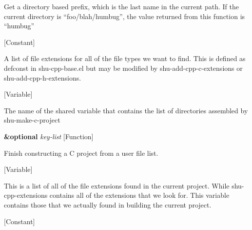 \begin{doc-string}
Get a directory based prefix, which is the last name in the current path.  If the current
directory is ``foo/blah/humbug'', the value returned from this function is ``humbug''
\end{doc-string}

\vspace{1em}
\noindent
{}
\usebox{\funcname}
 \hfill [Constant]

\begin{doc-string}
A list of file extensions for all of the file types we want to find.  This is defined
as defconst in shu-cpp-base.el but may be modified by shu-add-cpp-c-extensions or
shu-add-cpp-h-extensions.
\end{doc-string}

\vspace{1em}
\noindent
{}
\usebox{\funcname}
 \hfill [Variable]

\begin{doc-string}
The name of the shared variable that contains the list of directories assembled
by shu-make-c-project
\end{doc-string}

\vspace{1em}
\noindent
{}
\usebox{\funcname}\textbf{\&optional} \emph{key-list}
 \hfill [Function]

\begin{doc-string}
Finish constructing a C project from a user file list.
\end{doc-string}

\vspace{1em}
\noindent
{}
\usebox{\funcname}
 \hfill [Variable]

\begin{doc-string}
This is a list of all of the file extensions found in the current project.  While
shu-cpp-extensions contains all of the extensions that we look for.  This variable
contains those that we actually found in building the current project.
\end{doc-string}

\vspace{1em}
\noindent
{}
\usebox{\funcname}
 \hfill [Constant]


